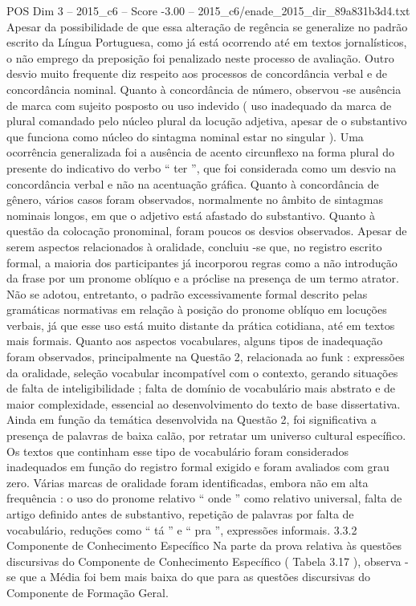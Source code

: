 \begin{textsample}{POS Dim 3 – 2015\_c6 – Score -3.00 – 2015\_c6/enade\_2015\_dir\_89a831b3d4.txt}
Apesar da possibilidade de que essa alteração de regência se generalize no padrão escrito da Língua Portuguesa, como já está ocorrendo até em textos jornalísticos, o não emprego da preposição foi penalizado neste processo de avaliação.
Outro desvio muito frequente diz respeito aos processos de concordância verbal e de concordância nominal.
Quanto à concordância de número, observou -se ausência de marca com sujeito posposto ou uso indevido ( uso inadequado da marca de plural comandado pelo núcleo plural da locução adjetiva, apesar de o substantivo que funciona como núcleo do sintagma nominal estar no singular ).
Uma ocorrência generalizada foi a ausência de acento circunflexo na forma plural do presente do indicativo do verbo “ ter ”, que foi considerada como um desvio na concordância verbal e não na acentuação gráfica.
Quanto à concordância de gênero, vários casos foram observados, normalmente no âmbito de sintagmas nominais longos, em que o adjetivo está afastado do substantivo.
Quanto à questão da colocação pronominal, foram poucos os desvios observados.
Apesar de serem aspectos relacionados à oralidade, concluiu -se que, no registro escrito formal, a maioria dos participantes já incorporou regras como a não introdução da frase por um pronome oblíquo e a próclise na presença de um termo atrator.
Não se adotou, entretanto, o padrão excessivamente formal descrito pelas gramáticas normativas em relação à posição do pronome oblíquo em locuções verbais, já que esse uso está muito distante da prática cotidiana, até em textos mais formais.
Quanto aos aspectos vocabulares, alguns tipos de inadequação foram observados, principalmente na Questão 2, relacionada ao funk : expressões da oralidade, seleção vocabular incompatível com o contexto, gerando situações de falta de inteligibilidade ; falta de domínio de vocabulário mais abstrato e de maior complexidade, essencial ao desenvolvimento do texto de base dissertativa.
Ainda em função da temática desenvolvida na Questão 2, foi significativa a presença de palavras de baixa calão, por retratar um universo cultural específico.
Os textos que continham esse tipo de vocabulário foram considerados inadequados em função do registro formal exigido e foram avaliados com grau zero.
Várias marcas de oralidade foram identificadas, embora não em alta frequência : o uso do pronome relativo “ onde ” como relativo universal, falta de artigo definido antes de substantivo, repetição de palavras por falta de vocabulário, reduções como “ tá ” e “ pra ”, expressões informais. 3.3.2 Componente de Conhecimento Específico Na parte da prova relativa às questões discursivas do Componente de Conhecimento Específico ( Tabela 3.17 ), observa -se que a Média foi bem mais baixa do que para as questões discursivas do Componente de Formação Geral.

\end{textsample}
